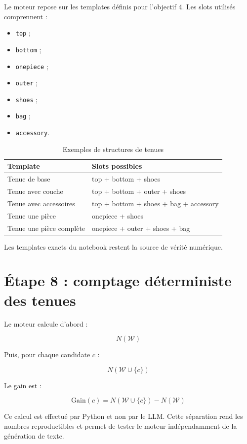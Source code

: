 \documentclass[11pt,a4paper]{article}
\begin{document}
Le moteur repose sur les templates définis pour l'objectif 4. Les slots
utilisés comprennent :

\begin{itemize}[leftmargin=*]
    \item \texttt{top} ;
    \item \texttt{bottom} ;
    \item \texttt{onepiece} ;
    \item \texttt{outer} ;
    \item \texttt{shoes} ;
    \item \texttt{bag} ;
    \item \texttt{accessory}.
\end{itemize}

\begin{table}[H]
\centering
\caption{Exemples de structures de tenues}
\begin{tabular}{ll}
\toprule
\textbf{Template} & \textbf{Slots possibles} \\
\midrule
Tenue de base & top + bottom + shoes \\
Tenue avec couche & top + bottom + outer + shoes \\
Tenue avec accessoires & top + bottom + shoes + bag + accessory \\
Tenue une pièce & onepiece + shoes \\
Tenue une pièce complète & onepiece + outer + shoes + bag \\
\bottomrule
\end{tabular}
\end{table}

Les templates exacts du notebook restent la source de vérité numérique.

\section{Étape 8 : comptage déterministe des tenues}

Le moteur calcule d'abord :

\[
N(\mathcal{W})
\]

Puis, pour chaque candidate $c$ :

\[
N(\mathcal{W}\cup\{c\})
\]

Le gain est :

\[
\mathrm{Gain}(c)
=
N(\mathcal{W}\cup\{c\})-N(\mathcal{W})
\]

Ce calcul est effectué par Python et non par le LLM. Cette séparation rend les
nombres reproductibles et permet de tester le moteur indépendamment de la
génération de texte.
\end{document}
